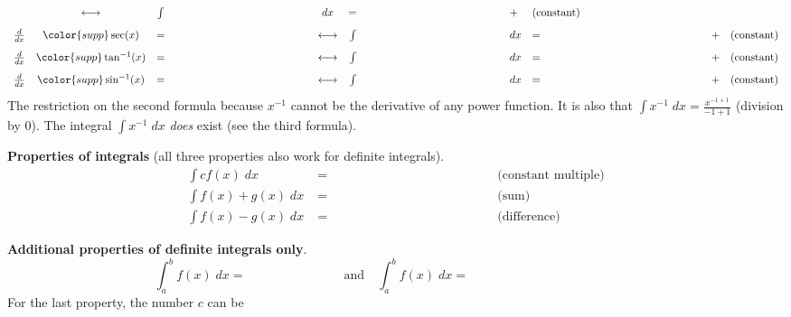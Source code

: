 \documentclass[../main.tex]{subfiles}
\begin{document}
\[\begin{array}{rcclcrclllcl}
                   & \longleftrightarrow 
                   & \int & \phantom{\color{main} \sec^{2}(x)} & dx &=& \phantom{\color{supp} \tan(x)} 
                   &+& (\text{constant}) \\[2ex]
      \frac{d}{dx} & {\color{supp} \sec(x)} &=& \phantom{\color{main} \tan(x)\sec(x)}
                   & \longleftrightarrow 
                   & \int & \phantom{\color{main} \tan(x)\sec(x)} & dx &=& \phantom{\color{supp} \sec(x)} 
                   &+& (\text{constant}) \\[2ex]
      \frac{d}{dx} & {\color{supp} \arctan(x)} &=& \phantom{\color{main} \frac{1}{x^{2}+1}}
                   & \longleftrightarrow 
                   & \int & \phantom{\color{main} \frac{1}{x^{2} + 1}} & dx &=& \phantom{\color{supp} \arctan(x)} 
                   &+& (\text{constant}) \\[2ex]
      \frac{d}{dx} & {\color{supp} \arcsin(x)} &=& \phantom{\color{main} \frac{1}{\sqrt{1 - x^{2}}}}
                   & \longleftrightarrow 
                   & \int & \phantom{\color{main} \frac{1}{\sqrt{1 - x^{2}}}} & dx &=& \phantom{\color{supp} \arcsin(x)} 
                   &+& (\text{constant})
    \end{array}
  \]
  {\footnotesize \faExclamationTriangle{} The restriction  on the second formula  because \(x^{-1}\) cannot be the derivative of any power function. It is also  that \(\textstyle \int x^{-1} \;dx = \frac{x^{-1 + 1}}{-1 + 1}\) (division by \(0\)). The integral \(\textstyle \int x^{-1} \;dx\) \emph{does} exist (see the third formula).}

  \textbf{Properties of integrals} (all three properties also work for definite integrals).
  \begin{align*}
    \int c f(x) \;dx 
    &= \phantom{c \int f(x) \;dx} && \text{(constant multiple)}\\
    \int f(x) + g(x) \;dx 
    &= \phantom{\int f(x) \;dx + \int g(x) \;dx} && \text{(sum)}\\
    \int f(x) - g(x) \;dx 
    &= \phantom{\int f(x) \;dx - \int g(x) \;dx} && \text{(difference)}
  \end{align*}

  \textbf{Additional properties of definite integrals only}.
  \[
    \int_{a}^{b} f(x) \;dx = \phantom{- \int_{b}^{a} f(x) \;dx}
    \quad\text{and}\quad
    \int_{a}^{b} f(x) \;dx = \phantom{\int_{a}^{c} f(x) \;dx + \int_{c}^{b} f(x) \;dx.}
  \]
  For the last property, the number \(c\) can be \underline{\hspace{4in}}
  \clearpage
\end{document}
